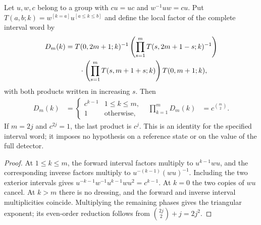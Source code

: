 \begin{lemma}
    \label{lem:mpug_detector_spatial_endpoint_word}
    \leanok
    Let $u,w,c$ belong to a group with $cu=uc$ and $w^{-1}uw=cu$.
    Put $T(a,b;k)=w^{[k=a]}u^{[a\leq k\leq b]}$ and define the local
    factor of the complete interval word by
    \begin{align}
        D_m(k) & =T(0,2m+1;k)^{-1}
        \left(\prod_{s=1}^m T(s,2m+1-s;k)^{-1}\right)\notag                    \\
               & \qquad\cdot\left(\prod_{s=1}^m T(s,m+1+s;k)\right)T(0,m+1;k),
        \label{eq:mpug_detector_spatial_word}
    \end{align}
    with both products written in increasing $s$. Then
    \begin{align}
        D_m(k) & =\begin{cases}c^{k-1}&1\leq k\leq m,\\1&\text{otherwise},\end{cases}
               & \prod_{k=1}^m D_m(k)                                                 & =c^{\binom m2}.
        \label{eq:mpug_detector_spatial_factors}
    \end{align}
    If $m=2j$ and $c^{2j}=1$, the last product is $c^j$.
    This is an identity for the specified interval word; it imposes no
    hypothesis on a reference state or on the value of the full detector.
\end{lemma}

\begin{proof}\leanok
    At $1\leq k\leq m$, the forward interval factors multiply to
    $u^{k-1}wu$, and the corresponding inverse factors multiply to
    $u^{-(k-1)}(wu)^{-1}$. Including the two exterior intervals gives
    $u^{-k-1}w^{-1}u^{k-1}wu^2=c^{k-1}$.
    At $k=0$ the two copies of $wu$ cancel. At $k>m$ there is no dressing,
    and the forward and inverse interval multiplicities coincide.
    Multiplying the remaining phases gives the triangular exponent;
    its even-order reduction follows from $\binom{2j}2+j=2j^2$.
\end{proof}

